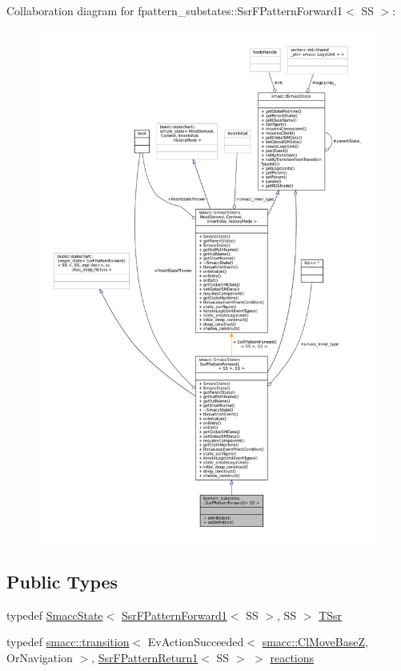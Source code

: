 Collaboration diagram for fpattern\+\_\+substates\+:\+:Ssr\+F\+Pattern\+Forward1$<$ SS $>$\+:
\nopagebreak
\begin{figure}[H]
\begin{center}
\leavevmode
\includegraphics[width=350pt]{structfpattern__substates_1_1SsrFPatternForward1__coll__graph}
\end{center}
\end{figure}
\subsection*{Public Types}
\begin{DoxyCompactItemize}
\item 
typedef \hyperlink{classSmaccState}{Smacc\+State}$<$ \hyperlink{structfpattern__substates_1_1SsrFPatternForward1}{Ssr\+F\+Pattern\+Forward1}$<$ SS $>$, SS $>$ \hyperlink{structfpattern__substates_1_1SsrFPatternForward1_a155b8837b3dde89979e913435997f704}{T\+Ssr}
\item 
typedef \hyperlink{classsmacc_1_1transition}{smacc\+::transition}$<$ Ev\+Action\+Succeeded$<$ \hyperlink{classsmacc_1_1ClMoveBaseZ}{smacc\+::\+Cl\+Move\+BaseZ}, Or\+Navigation $>$, \hyperlink{structfpattern__substates_1_1SsrFPatternReturn1}{Ssr\+F\+Pattern\+Return1}$<$ SS $>$ $>$ \hyperlink{structfpattern__substates_1_1SsrFPatternForward1_a7ac0fadfa295c4f4e3539002d3c41b80}{reactions}
\end{DoxyCompactItemize}
